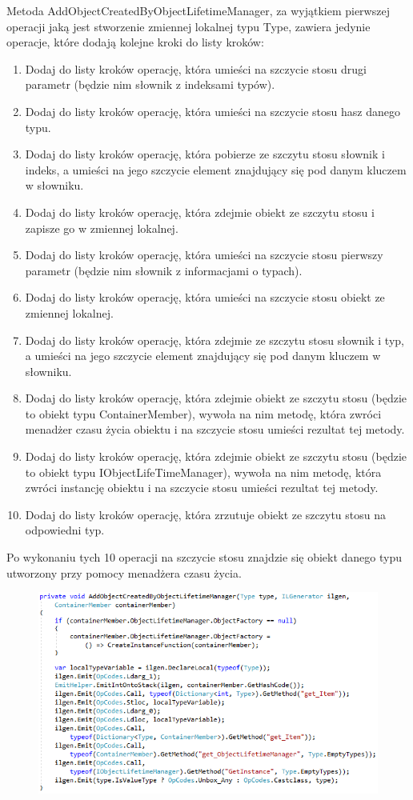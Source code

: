 \documentclass[12pt]{article}
\begin{document}
Metoda AddObjectCreatedByObjectLifetimeManager, za wyjątkiem pierwszej operacji jaką jest stworzenie zmiennej lokalnej typu Type, zawiera jedynie operacje, które dodają kolejne kroki do listy kroków:
\begin{enumerate}
	\item Dodaj do listy kroków operację, która umieści na szczycie stosu drugi parametr (będzie nim słownik z indeksami typów).
	\item Dodaj do listy kroków operację, która umieści na szczycie stosu hasz danego typu.
	\item Dodaj do listy kroków operację, która pobierze ze szczytu stosu słownik i indeks, a umieści na jego szczycie element znajdujący się pod danym kluczem w słowniku.
	\item Dodaj do listy kroków operację, która zdejmie obiekt ze szczytu stosu i zapisze go w zmiennej lokalnej.
	\item Dodaj do listy kroków operację, która umieści na szczycie stosu pierwszy parametr (będzie nim słownik z informacjami o typach).
	\item Dodaj do listy kroków operację, która umieści na szczycie stosu obiekt ze zmiennej lokalnej.
	\item Dodaj do listy kroków operację, która zdejmie ze szczytu stosu słownik i typ, a umieści na jego szczycie element znajdujący się pod danym kluczem w słowniku.
	\item Dodaj do listy kroków operację, która zdejmie obiekt ze szczytu stosu (będzie to obiekt typu ContainerMember), wywoła na nim metodę, która zwróci menadżer czasu życia obiektu i na szczycie stosu umieści rezultat tej metody.
	\item Dodaj do listy kroków operację, która zdejmie obiekt ze szczytu stosu (będzie to obiekt typu IObjectLifeTimeManager), wywoła na nim metodę, która zwróci instancję obiektu i na szczycie stosu umieści rezultat tej metody.
	\item Dodaj do listy kroków operację, która zrzutuje obiekt ze szczytu stosu na odpowiedni typ.
\end{enumerate}
Po wykonaniu tych 10 operacji na szczycie stosu znajdzie się obiekt danego typu utworzony przy pomocy menadżera czasu życia.
\begin{figure}[h]
	\begin{raggedleft}
  		\includegraphics{FullEmitFunction_AddObjectCreatedByObjectLifetimeManager.png}
	\end{raggedleft}
\end{figure}\\
\end{document}
